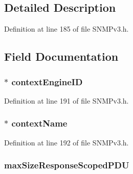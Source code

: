 \subsection{Detailed Description}


Definition at line 185 of file S\+N\+M\+Pv3.\+h.



\subsection{Field Documentation}
\hypertarget{structdispatcher_process_pdu_aa75baf2d001f5d5ac415eed279fd6e85}{}
\subsubsection[{context\+Engine\+I\+D}]{$\ast$ context\+Engine\+I\+D}\label{structdispatcher_process_pdu_aa75baf2d001f5d5ac415eed279fd6e85}


Definition at line 191 of file S\+N\+M\+Pv3.\+h.

\hypertarget{structdispatcher_process_pdu_af55ce5882ccbc8435fb33f1020c74550}{}
\subsubsection[{context\+Name}]{$\ast$ context\+Name}\label{structdispatcher_process_pdu_af55ce5882ccbc8435fb33f1020c74550}


Definition at line 192 of file S\+N\+M\+Pv3.\+h.

\hypertarget{structdispatcher_process_pdu_aefdab5fab337456692dd4eafbbf61c1a}{}
\subsubsection[{max\+Size\+Response\+Scoped\+P\+D\+U}]{ max\+Size\+Response\+Scoped\+P\+D\+U}\label{structdispatcher_process_pdu_aefdab5fab337456692dd4eafbbf61c1a}


